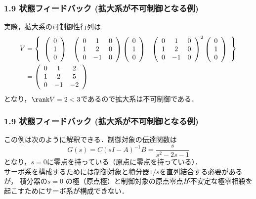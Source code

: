 \begin{frame}[t]
\frametitle{1.9 状態フィードバック (拡大系が不可制御となる例)}
実際，拡大系の可制御性行列は
\begin{align}
 V &=
 \left\{
 \begin{array}{ccc}
 \left(
 \begin{array}{c}
  0 \\
  1 \\
  0
 \end{array}
 \right) &
 \left(
 \begin{array}{ccc}
  0 & 1 & 0 \\
  1 & 2 & 0 \\
  0 & -1 & 0 \\
 \end{array}
 \right)
 \left(
 \begin{array}{c}
  0 \\
  1 \\
  0
 \end{array}
 \right) &
 \left(
 \begin{array}{ccc}
  0 & 1 & 0 \\
  1 & 2 & 0 \\
  0 & -1 & 0 \\
 \end{array}
 \right)^2
 \left(
 \begin{array}{c}
  0 \\
  1 \\
  0
 \end{array}
 \right)
 \end{array}
 \right\} \notag\\ &=
 \left(
 \begin{array}{ccc}
  0 & 1 & 2 \\
  1 & 2 & 5 \\
  0 & -1 & -2 \\
 \end{array}
 \right)\notag
\end{align}
となり，$\rank V = 2<3$であるので拡大系は不可制御である．\\
\end{frame}


\begin{frame}[t]
\frametitle{1.9 状態フィードバック (拡大系が不可制御となる例)}
この例は次のように解釈できる．制御対象の伝達関数は
\[
 G(s) = C(sI-A)^{-1}B = \frac{s}{s^2-2s-1}
\]
となり，$s=0$に零点を持っている（原点に零点を持っている）．\\
サーボ系を構成するためには制御対象と積分器$1/s$を直列結合する必要があるが，
積分器の$s=0$ の極（原点極）と制御対象の原点零点が不安定な極零相殺を起こすためにサーボ系が構成できない．
\end{frame}



